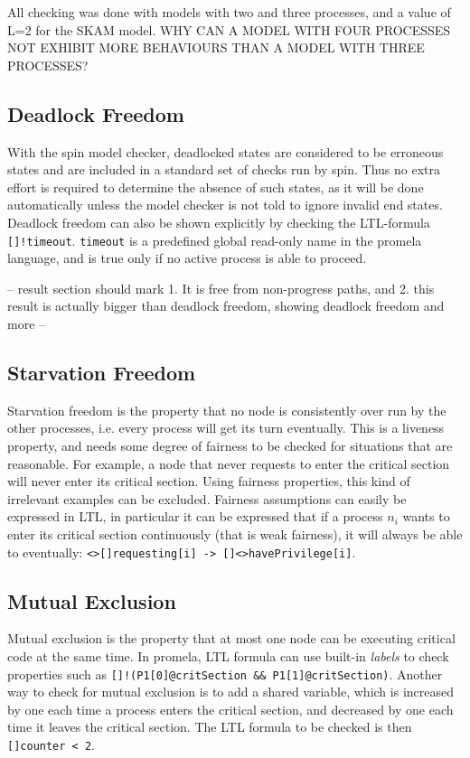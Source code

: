 \documentclass[a4paper,12pt]{llncs}
\begin{document}
All checking was done with models with two and three processes, and a value of L=2 for the SKAM model. WHY CAN A MODEL WITH FOUR PROCESSES NOT EXHIBIT MORE BEHAVIOURS THAN A MODEL WITH THREE PROCESSES?

\subsection{Deadlock Freedom}
With the spin model checker, deadlocked states are considered to be erroneous states and are included in a standard set of checks run by spin. Thus no extra effort is required to determine the absence of such states, as it will be done automatically unless the model checker is not told to ignore invalid end states. Deadlock freedom can also be shown explicitly by checking the LTL-formula \texttt{[]!timeout}. \texttt{timeout} is a predefined global read-only name in the promela language, and is true only if no active process is able to proceed.

-- result section should mark 1. It is free from non-progress paths, and 2. this result is actually bigger than deadlock freedom, showing deadlock freedom and more --

\subsection{Starvation Freedom}
Starvation freedom is the property that no node is consistently over run by the other processes, i.e. every process will get its turn eventually. This is a liveness property, and needs some degree of fairness to be checked for situations that are reasonable. For example, a node that never requests to enter the critical section will never enter its critical section. Using fairness properties, this kind of irrelevant examples can be excluded. Fairness assumptions can easily be expressed in LTL, in particular it can be expressed that if a process $n_i$ wants to enter its critical section continuously (that is weak fairness), it will always be able to eventually: \texttt{<>[]requesting[i] -> []<>havePrivilege[i]}.


\subsection{Mutual Exclusion}
Mutual exclusion is the property that at most one node can be executing critical code at the same time. In promela, LTL formula can use built-in \emph{labels} to check properties such as \texttt{[]!(P1[0]@critSection \&\& P1[1]@critSection)}. Another way to check for mutual exclusion is to add a shared variable, which is increased by one each time a process enters the critical section, and decreased by one each time it leaves the critical section. The LTL formula to be checked is then \texttt{[]counter < 2}.
\end{document}
